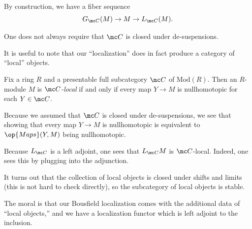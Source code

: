 \documentclass[../notes.tex]{subfiles}
\begin{document}
\begin{remark}
	By construction, we have a fiber sequence
	\[G_{\mc C}(M)\to M\to L_{\mc C}(M).\]
\end{remark}
\begin{remark}
	One does not always require that $\mc C$ is closed under de-suspensions.
\end{remark}
It is useful to note that our ``localization'' does in fact produce a category of ``local'' objects.
\begin{definition}[local]
	Fix a ring $R$ and a presentable full subcategory $\mc C$ of $\mathrm{Mod}(R)$. Then an $R$-module $M$ is \textit{$\mc C$-local} if and only if every map $Y\to M$ is nullhomotopic for each $Y\in\mc C$.
\end{definition}
\begin{remark}
	Because we assumed that $\mc C$ is closed under de-suspensions, we see that showing that every map $Y\to M$ is nullhomotopic is equivalent to $\op{Maps}(Y,M)$ being nullhomotopic.
\end{remark}
\begin{remark} \label{rem:localization-is-local}
	Because $L_{\mc C}$ is a left adjoint, one sees that $L_{\mc C}M$ is $\mc C$-local. Indeed, one sees this by plugging into the adjunction.
\end{remark}
\begin{remark}
	It turns out that the collection of local objects is closed under shifts and limits (this is not hard to check directly), so the subcategory of local objects is stable.
\end{remark}
The moral is that our Bousfield localization comes with the additional data of ``local objects,'' and we have a localization functor which is left adjoint to the inclusion.
\end{document}
